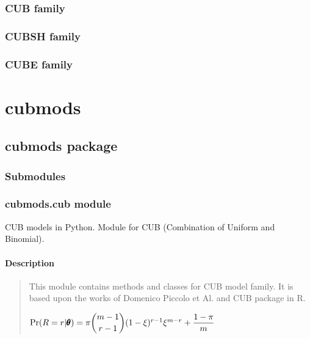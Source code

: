 \documentclass[letterpaper,10pt,english]{sphinxmanual}
\begin{document}
\subsection{CUB family}
\label{\detokenize{manual:id200}}

\subsection{CUBSH family}
\label{\detokenize{manual:id201}}

\subsection{CUBE family}
\label{\detokenize{manual:id202}}
\sphinxstepscope


\chapter{cubmods}
\label{\detokenize{modules:cubmods}}\label{\detokenize{modules::doc}}
\sphinxstepscope


\section{cubmods package}
\label{\detokenize{cubmods:cubmods-package}}\label{\detokenize{cubmods::doc}}

\subsection{Submodules}
\label{\detokenize{cubmods:submodules}}

\subsection{cubmods.cub module}
\label{\detokenize{cubmods:module-cubmods.cub}}\label{\detokenize{cubmods:cubmods-cub-module}}
\sphinxAtStartPar
CUB models in Python.
Module for CUB (Combination of Uniform
and Binomial).


\subsubsection{Description}
\label{\detokenize{cubmods:description}}\begin{quote}

\sphinxAtStartPar
This module contains methods and classes
for CUB model family.
It is based upon the works of Domenico
Piccolo et Al. and CUB package in R.

\sphinxAtStartPar
\(\Pr(R=r|\pmb{\theta}) = \pi \dbinom{m-1}{r-1}(1-\xi)^{r-1}\xi^{m-r}+\dfrac{1-\pi}{m}\)
\end{quote}
\end{document}
